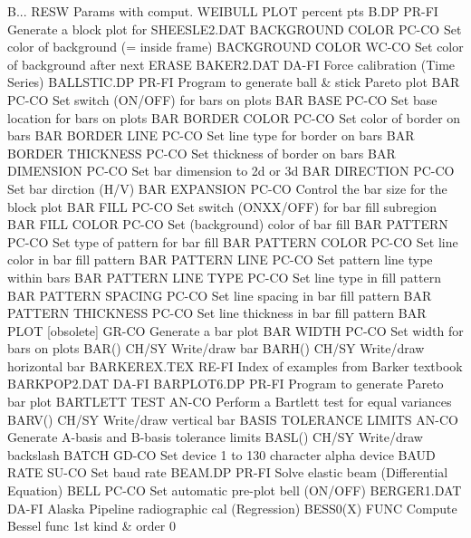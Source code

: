 B...                        RESW  Params with comput. WEIBULL PLOT percent pts
B.DP                        PR-FI Generate a block plot for SHEESLE2.DAT
BACKGROUND COLOR            PC-CO Set color of background (= inside frame)
BACKGROUND COLOR            WC-CO Set color of background after next ERASE
BAKER2.DAT                  DA-FI Force calibration (Time Series)
BALLSTIC.DP                 PR-FI Program to generate ball & stick Pareto plot
BAR                         PC-CO Set switch (ON/OFF) for bars on plots
BAR BASE                    PC-CO Set base location for bars on plots
BAR BORDER COLOR            PC-CO Set color of border on bars
BAR BORDER LINE             PC-CO Set line type for border on bars
BAR BORDER THICKNESS        PC-CO Set thickness of border on bars
BAR DIMENSION               PC-CO Set bar dimension to 2d or 3d
BAR DIRECTION               PC-CO Set bar dirction (H/V)
BAR EXPANSION               PC-CO Control the bar size for the block plot
BAR FILL                    PC-CO Set switch (ONXX/OFF) for bar fill subregion
BAR FILL COLOR              PC-CO Set (background) color of bar fill
BAR PATTERN                 PC-CO Set type of pattern for bar fill
BAR PATTERN COLOR           PC-CO Set line color in bar fill pattern
BAR PATTERN LINE            PC-CO Set pattern line type within bars
BAR PATTERN LINE TYPE       PC-CO Set line type in fill pattern
BAR PATTERN SPACING         PC-CO Set line spacing in bar fill pattern
BAR PATTERN THICKNESS       PC-CO Set line thickness in bar fill pattern
BAR PLOT [obsolete]         GR-CO Generate a bar plot
BAR WIDTH                   PC-CO Set width for bars on plots
BAR()                       CH/SY Write/draw bar
BARH()                      CH/SY Write/draw horizontal bar
BARKEREX.TEX                RE-FI Index of examples from Barker textbook
BARKPOP2.DAT                DA-FI
BARPLOT6.DP                 PR-FI Program to generate Pareto bar plot
BARTLETT TEST               AN-CO Perform a Bartlett test for equal variances
BARV()                      CH/SY Write/draw vertical bar
BASIS TOLERANCE LIMITS      AN-CO Generate A-basis and B-basis tolerance limits
BASL()                      CH/SY Write/draw backslash
BATCH                       GD-CO Set device 1 to 130 character alpha device
BAUD RATE                   SU-CO Set baud rate
BEAM.DP                     PR-FI Solve elastic beam (Differential Equation)
BELL                        PC-CO Set automatic pre-plot bell (ON/OFF)
BERGER1.DAT                 DA-FI Alaska Pipeline radiographic cal (Regression)
BESS0(X)                    FUNC  Compute Bessel func 1st kind & order 0
